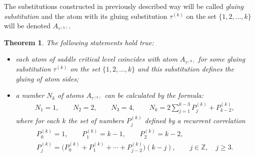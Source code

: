 \documentclass[pdftex]{sigma}
\numberwithin{equation}{section}
\newtheorem{Theorem}{Theorem}[section]
\begin{document}
The substitutions constructed in previously described way will be called \emph{gluing substitution} and the atom with its gluing substitution ${\tau^{(k)}}$ on the set $\{1,2,\ldots,k\}$ will be denoted $A_{\tau^{(k)}}$.

\begin{Theorem}\label{theorem3.1}
The following statements hold true:
\begin{itemize}\itemsep=0pt
\item[$1)$] each atom of saddle critical level coincides with atom $A_{\tau^{(k)}}$ for some gluing substitution $\tau^{(k)}$ on the set $\{1,2,\ldots,k\}$ and this substitution defines the gluing of atom sides;
\item[$2)$] a number $N_{k}$ of atoms $A_{\tau^{(k)}}$ can be calculated by the formula:
\begin{gather*}
N_{1}=1, \qquad N_{2}=2, \qquad N_{3}=4, \qquad N_{k}=2\sum_{j=1}^{k-3}P_{j}^{(k)}+P_{k-2}^{(k)},
\end{gather*}
where for each $k$ the set of numbers $P_{j}^{(k)}$ defined by a recurrent correlation
\begin{gather*}
P_{0}^{(k)}=1, \qquad P_{1}^{(k)}=k-1, \qquad P_{2}^{(k)}=k-2, \\
P_{j}^{(k)}=\big(P_{0}^{(k)}+P_{1}^{(k)}+\cdots+P_{j-2}^{(k)}\big)(k-j), \qquad j\in {\mathbb Z}, \quad j\geq3.
\end{gather*}
\end{itemize}
\end{Theorem}
\end{document}
